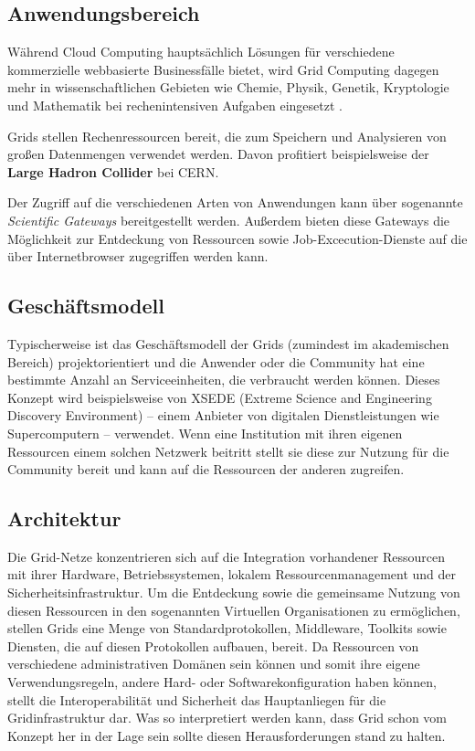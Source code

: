 \subsection{Anwendungsbereich}
Während Cloud Computing hauptsächlich Lösungen für verschiedene kommerzielle webbasierte Businessfälle bietet, wird Grid Computing dagegen mehr in wissenschaftlichen Gebieten wie Chemie, Physik, Genetik, Kryptologie und Mathematik bei rechenintensiven Aufgaben eingesetzt \cite{5623257}.

Grids stellen Rechenressourcen bereit, die zum Speichern und Analysieren von großen Datenmengen verwendet werden. Davon profitiert beispielsweise der \textbf{Large Hadron Collider} bei CERN.\cite{wlcg}

Der Zugriff auf die verschiedenen Arten von Anwendungen kann über sogenannte \textit{Scientific Gateways} bereitgestellt werden. Außerdem bieten diese Gateways die Möglichkeit zur Entdeckung von Ressourcen sowie Job-Excecution-Dienste auf die über Internetbrowser zugegriffen werden kann\cite{360-degree-compared}.

\subsection{Geschäftsmodell}
Typischerweise ist das Geschäftsmodell der Grids (zumindest im akademischen Bereich) projektorientiert und die Anwender oder die Community hat eine bestimmte Anzahl an Serviceeinheiten, die verbraucht werden können\cite{360-degree-compared}.  
Dieses Konzept wird beispielsweise von XSEDE (Extreme Science and Engineering Discovery Environment) -- einem Anbieter von digitalen Dienstleistungen wie Supercomputern -- verwendet\cite{xsede}.
Wenn eine Institution mit ihren eigenen Ressourcen einem solchen Netzwerk beitritt stellt sie diese zur Nutzung für die Community bereit und kann auf die Ressourcen der anderen zugreifen\cite{360-degree-compared}.



\subsection{Architektur}
Die Grid-Netze konzentrieren sich auf die Integration vorhandener Ressourcen mit ihrer Hardware, Betriebssystemen, lokalem Ressourcenmanagement und der Sicherheitsinfrastruktur.
Um die Entdeckung sowie die gemeinsame Nutzung von diesen Ressourcen in den sogenannten \glqq Virtuellen Organisationen\grqq{} zu ermöglichen, stellen Grids eine Menge von Standardprotokollen, Middleware, Toolkits sowie Diensten, die auf diesen Protokollen aufbauen, bereit.
Da Ressourcen von verschiedene administrativen Domänen sein können und somit ihre eigene Verwendungsregeln, andere Hard- oder Softwarekonfiguration haben können, stellt die Interoperabilität und Sicherheit das Hauptanliegen für die Gridinfrastruktur dar.\cite{360-degree-compared}
Was so interpretiert werden kann, dass Grid schon vom Konzept her in der Lage sein sollte diesen Herausforderungen stand zu halten.

